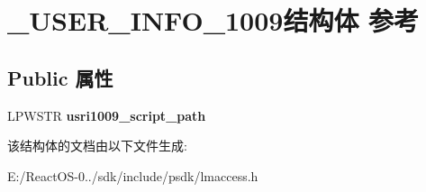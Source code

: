 \hypertarget{struct___u_s_e_r___i_n_f_o__1009}{}\section{\+\_\+\+U\+S\+E\+R\+\_\+\+I\+N\+F\+O\+\_\+1009结构体 参考}
\label{struct___u_s_e_r___i_n_f_o__1009}
\subsection*{Public 属性}
\begin{DoxyCompactItemize}
\item 
\mbox{\label{struct___u_s_e_r___i_n_f_o__1009_a6a2e873844e0134686ff23efd1c86424}} 
L\+P\+W\+S\+TR {\bfseries usri1009\+\_\+script\+\_\+path}
\end{DoxyCompactItemize}


该结构体的文档由以下文件生成\+:\begin{DoxyCompactItemize}
\item 
E\+:/\+React\+O\+S-\/0../sdk/include/psdk/lmaccess.\+h\end{DoxyCompactItemize}
